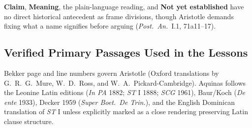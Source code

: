 \textbf{Claim}, \textbf{Meaning}, the plain-language reading, and \textbf{Not yet established} have no direct historical antecedent as frame divisions, though Aristotle demands fixing what a name signifies before arguing (\emph{Post.\ An.}\ I.1, 71a11--17).

\subsection{Verified Primary Passages Used in the Lessons}

Bekker page and line numbers govern Aristotle (Oxford translations by G.\ R.\ G.\ Mure, W.\ D.\ Ross, and W.\ A.\ Pickard-Cambridge). Aquinas follows the Leonine Latin editions (\emph{In PA} 1882; \emph{ST} I 1888; \emph{SCG} 1961), Baur/Koch (\emph{De ente} 1933), Decker 1959 (\emph{Super Boet.\ De Trin.}), and the English Dominican translation of \emph{ST} I unless explicitly marked as a close rendering preserving Latin clause structure.

